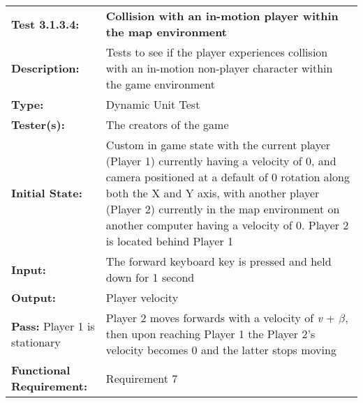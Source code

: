 \documentclass[12pt, titlepage]{article}
\begin{document}
\begin{mdframed}[linewidth=1pt]
\begin{tabularx}{\textwidth}{@{}p{3cm}X@{}}
{\bf Test 3.1.3.4:} & {\bf Collision with an in-motion player within the map environment}\\[\baselineskip]
{\bf Description:} & Tests to see if the player experiences collision with an in-motion non-player character within the game environment\\[0.5\baselineskip]
{\bf Type:} & Dynamic Unit Test\\[0.5\baselineskip]
{\bf Tester(s):} & The creators of the game\\[0.5\baselineskip]
{\bf Initial State:} & Custom in game state with the current player (Player 1) currently having a velocity of 0, and camera positioned at a default of 0 rotation along both the X and Y axis, with another player (Player 2) currently in the map environment on another computer  having a velocity of 0. Player 2 is located behind Player 1\\[0.5\baselineskip]
{\bf Input:} & The forward keyboard key is pressed and held down for 1 second \\[0.5\baselineskip]
{\bf Output:} & Player velocity\\[0.5\baselineskip]
{\bf Pass:} Player 1 is stationary & Player 2 moves forwards with a velocity of \textit{v} + $\beta$, then upon reaching Player 1 the Player 2's velocity becomes 0 and the latter stops moving \\[0.5\baselineskip]
{\bf Functional Requirement:} & Requirement 7
\end{tabularx}
\end{mdframed}
\end{document}
